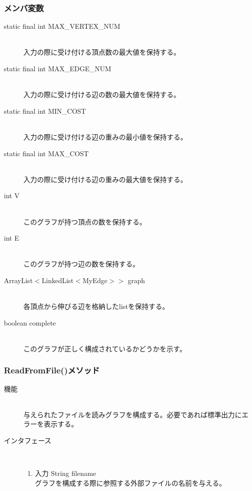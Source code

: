 \documentclass[a4j]{jarticle}
\begin{document}
\begin{description}
\begin{description}
\subsubsection{メンバ変数}
\begin{description}
\item[static final int MAX\_VERTEX\_NUM]~\\
入力の際に受け付ける頂点数の最大値を保持する。
\item[static final int MAX\_EDGE\_NUM]~\\
入力の際に受け付ける辺の数の最大値を保持する。
\item[static final int MIN\_COST]~\\
入力の際に受け付ける辺の重みの最小値を保持する。
\item[static final int MAX\_COST]~\\
入力の際に受け付ける辺の重みの最大値を保持する。
\item[int V]~\\
このグラフが持つ頂点の数を保持する。
\item[int E]~\\
このグラフが持つ辺の数を保持する。
\item[ArrayList$<$LinkedList$<$MyEdge$>$$>$ graph]~\\
各頂点から伸びる辺を格納したlistを保持する。
\item[boolean complete]~\\
このグラフが正しく構成されているかどうかを示す。
\end{description}

\subsubsection{ReadFromFile()メソッド}

\begin{description}
\item[機能]\mbox{}\\
与えられたファイルを読みグラフを構成する。必要であれば標準出力にエラーを表示する。

\item[インタフェース]\
  \begin{enumerate}
  \item 入力 String filename\mbox{}\\
    グラフを構成する際に参照する外部ファイルの名前を与える。 
  \end{enumerate}
\end{description}


\end{description}
\end{description}
\end{document}

